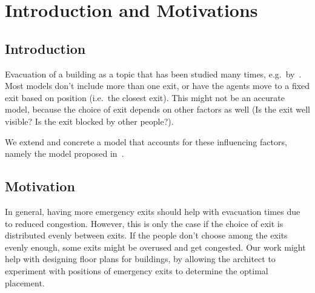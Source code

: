 \section{Introduction and Motivations}
\subsection{Introduction}
Evacuation of a building as a topic that has been studied many times,
e.g.\ by~\citet{Helbing2000}.
Most models don't include more than one exit, or have the agents move to a
fixed exit based on position (i.e.\ the closest exit). This might not be an
accurate model, because the choice of exit depends on other factors as well (Is
the exit well visible? Is the exit blocked by other people?).

We extend and concrete a model that accounts for these influencing factors,
namely the model proposed in~\citet{Wang2016}.

\subsection{Motivation}
In general, having more emergency exits should help with evacuation times due
to reduced congestion. However, this is only the case if the choice of exit is
distributed evenly between exits. If the people don't choose among the exits
evenly enough, some exits might be overused and get congested.
Our work might help with designing floor plans for buildings, by allowing the
architect to experiment with positions of emergency exits to determine the
optimal placement.
